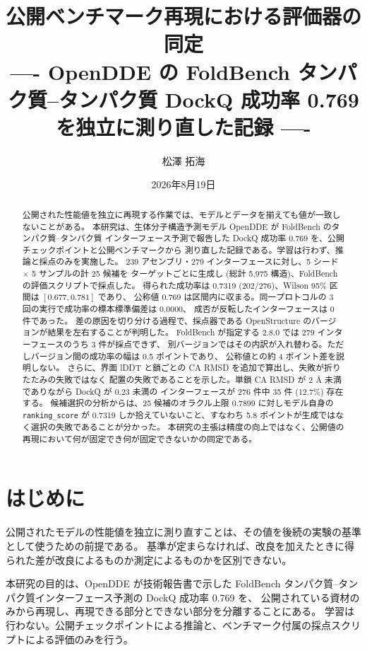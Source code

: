 \documentclass[11pt,a4paper]{article}
\title{公開ベンチマーク再現における評価器の同定\\
\large ---- OpenDDE の FoldBench タンパク質--タンパク質 DockQ 成功率 0.769 を独立に測り直した記録 ----}
\author{松澤 拓海}
\date{2026年8月19日}
\begin{document}
\maketitle

\begin{abstract}
公開された性能値を独立に再現する作業では、モデルとデータを揃えても値が一致しないことがある。
本研究は、生体分子構造予測モデル OpenDDE が FoldBench のタンパク質--タンパク質
インターフェース予測で報告した DockQ 成功率 0.769 を、公開チェックポイントと公開ベンチマークから
測り直した記録である。学習は行わず、推論と採点のみを実施した。
239 アセンブリ・279 インターフェースに対し、5 シード $\times$ 5 サンプルの計 25 候補を
ターゲットごとに生成し (総計 5,975 構造)、FoldBench の評価スクリプトで採点した。
得られた成功率は 0.7319 (202/276)、Wilson 95\% 区間は $[0.677, 0.781]$ であり、
公称値 0.769 は区間内に収まる。同一プロトコルの 3 回の実行で成功率の標本標準偏差は 0.0000、
成否が反転したインターフェースは 0 件であった。
差の原因を切り分ける過程で、採点器である OpenStructure のバージョンが結果を左右することが判明した。
FoldBench が指定する 2.8.0 では 279 インターフェースのうち 3 件が採点できず、
別バージョンではその内訳が入れ替わる。ただしバージョン間の成功率の幅は 0.5 ポイントであり、
公称値との約 4 ポイント差を説明しない。
さらに、界面 lDDT と鎖ごとの CA RMSD を追加で算出し、失敗が折りたたみの失敗ではなく
配置の失敗であることを示した。単鎖 CA RMSD が 2 \AA{} 未満でありながら DockQ が 0.23 未満の
インターフェースが 276 件中 35 件 (12.7\%) 存在する。
候補選択の分析からは、25 候補のオラクル上限 0.7899 に対しモデル自身の \texttt{ranking\_score} が
0.7319 しか拾えていないこと、すなわち 5.8 ポイントが生成ではなく選択の失敗であることが分かった。
本研究の主張は精度の向上ではなく、公開値の再現において何が固定でき何が固定できないかの同定である。
\end{abstract}

\section{はじめに}

公開されたモデルの性能値を独立に測り直すことは、その値を後続の実験の基準として使うための前提である。
基準が定まらなければ、改良を加えたときに得られた差が改良によるものか測定によるものかを区別できない。

本研究の目的は、OpenDDE \cite{opendde} が技術報告書で示した FoldBench \cite{foldbench}
タンパク質--タンパク質インターフェース予測の DockQ 成功率 0.769 を、
公開されている資材のみから再現し、再現できる部分とできない部分を分離することにある。
学習は行わない。公開チェックポイントによる推論と、ベンチマーク付属の採点スクリプトによる評価のみを行う。
\end{document}
